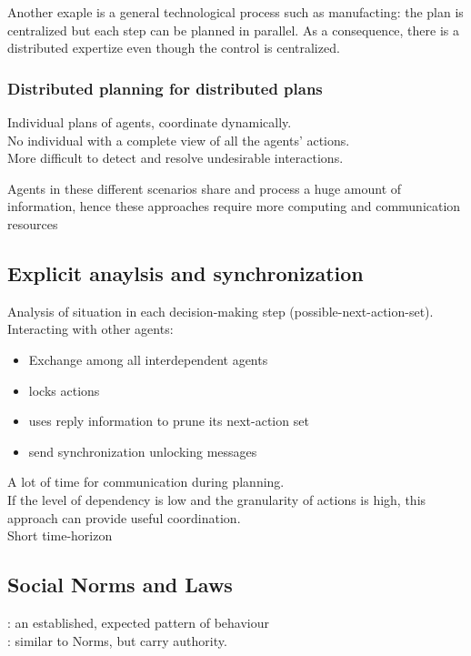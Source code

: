 Another exaple is a general technological process such as manufacting: the plan is centralized but each step can be planned in parallel. As a consequence, there is a distributed expertize even though the control is centralized.
\subsubsection{Distributed planning for distributed plans}
Individual plans of agents, coordinate dynamically.\\
No individual with a complete view of all the agents' actions.\\
More difficult to detect and resolve undesirable interactions.


Agents in these different scenarios share and process a huge amount of information, hence these approaches require more computing and communication resources

\subsection{Explicit anaylsis and synchronization}
Analysis of situation in each decision-making step (possible-next-action-set).\\
Interacting with other agents:
\begin{itemize}
\item Exchange among all interdependent agents
\item locks actions
\item uses reply information to prune its next-action set
\item send synchronization unlocking messages
\end{itemize}
A lot of time for communication during planning.\\
If the level of dependency is low and the granularity of actions is high, this approach can provide useful coordination.\\
Short time-horizon

\subsection{Social Norms and Laws}
: an established, expected pattern of behaviour\\
: similar to Norms, but carry authority.

